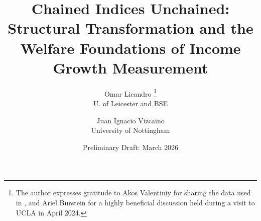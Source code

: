 \documentclass[12pt,a4paper]{article}
\begin{document}
\title{Chained Indices Unchained:  \\ {\Large Structural Transformation and the Welfare Foundations of Income Growth Measurement}}

\author{
Omar Licandro%
\footnote{The author expresses gratitude to Akos Valentiniy for sharing the data used in \cite{herrendorf_rogerson_valentinyi_2021}, and Ariel Burstein for a highly beneficial discussion held during a visit to UCLA in April 2024.} \\ {\small U. of Leicester and BSE} 
\and
Juan Ignacio Vizcaino \\ {\small University of Nottingham}}

\date{Preliminary Draft: March 2026}



\maketitle
\vspace{-1.00cm}
\end{document}
